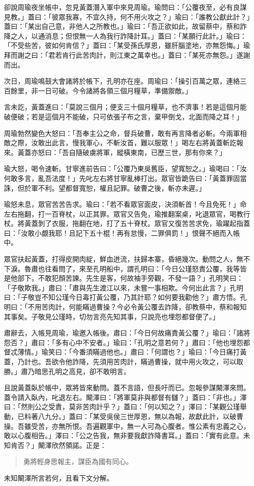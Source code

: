 卻說周瑜夜坐帳中，忽見黃蓋潛入軍中來見周瑜。瑜問曰：「公覆夜至，必有良謀見教。」蓋曰：「彼眾我寡，不宜久持，何不用火攻之？」瑜曰：「誰教公獻此計？」蓋曰：「某出自己意，非他人之所教也。」瑜曰：「吾正欲如此，故留蔡中，蔡和詐降之人，以通消息；但恨無一人為我行詐降計耳。」蓋曰：「某願行此計。」瑜曰：「不受些苦，彼如何肯信？」蓋曰：「某受孫氏厚恩，雖肝腦塗地，亦無怨悔。」瑜拜而謝之曰：「君若肯行此苦肉計，則江東之萬幸也。」蓋曰：「某死亦無怨。」遂謝而出。

次日，周瑜鳴鼓大會諸將於帳下，孔明亦在座。周瑜曰：「操引百萬之眾，連絡三百餘里，非一日可破。今令諸將各領三個月糧草，準備禦敵。」

言未訖，黃蓋進曰：「莫說三個月；便支三十個月糧草，也不濟事！若是這個月能破便破；若是這個月不能破，只可依張子布之言，棄甲倒戈，北面而降之耳！」

周瑜勃然變色大怒曰：「吾奉主公之命，督兵破曹，敢有再言降者必斬。今兩軍相敵之際，汝敢出此言，慢我軍心，不斬汝首，難以服眾！」喝左右將黃蓋斬訖報來。黃蓋亦怒曰：「吾自隨破虜將軍，縱橫東南，已歷三世，那有你來？」

瑜大怒，喝令速斬。甘寧進前告曰：「公覆乃東吳舊臣，望寬恕之。」瑜喝曰：「汝何敢多言，亂吾法度！」先叱左右將甘寧亂棒打出。眾官皆跪告曰：「黃蓋罪固當誅，但於軍不利。望都督寬恕，權且記罪。破曹之後，斬亦未遲。」

瑜怒未息，眾官苦苦告求。瑜曰：「若不看眾官面皮，決須斬首！今且免死！」命左右拖翻，打一百脊杖，以正其罪。眾官又告免，瑜推翻案桌，叱退眾官，喝教行杖。將黃蓋剝了衣服，拖翻在地，打了五十脊杖。眾官又復苦苦求免，瑜躍起指蓋曰：「汝敢小覷我耶！且記下五十棍！再有怠慢，二罪俱罰！」恨聲不絕而入帳中。

眾官扶起黃蓋，打得皮開肉綻，鮮血迸流，扶歸本寨，昏絕幾次。動問之人，無不下淚。魯肅也往看問了，來至孔明船中，謂孔明曰：「今日公瑾怒責公覆，我等皆是他部下，不敢犯顏苦諫。先生是客，何故袖手旁觀，不發一語？」孔明笑曰：「子敬欺我。」肅曰：「肅與先生渡江以來，未嘗一事相欺。今何出此言？」孔明曰：「子敬豈不知公瑾今日毒打黃公覆，乃其計耶？如何要我勸他？」肅方悟。孔明曰：「不用苦肉計，何能瞞過曹操？今必令黃公覆去詐降，卻教蔡中，蔡和報知其事矣。子敬見公瑾時，切勿言亮先知其事，只說亮也埋怨都督便了。」

肅辭去，入帳見周瑜，瑜邀入帳後。肅曰：「今日何故痛責黃公覆？」瑜曰：「諸將怨否？」肅曰：「多有心中不安者。」瑜曰：「孔明之意若何？」肅曰：「他也埋怨都督忒薄情。」瑜笑曰：「今番須瞞過他也。」肅曰：「何謂也？」瑜曰：「今日痛打黃蓋，乃計也。吾欲令他詐降，先須用苦肉計，瞞過曹操，就中用火攻之，可以取勝。」肅乃暗思孔明之高見，卻不敢明言。

且說黃蓋臥於帳中，眾將皆來動問。蓋不言語，但長吁而已。忽報參謀闞澤來問。蓋令請入臥內，叱退左右。闞澤曰：「將軍莫非與都督有讎？」蓋曰：「非也。」澤曰：「然則公之受責，莫非苦肉計乎？」蓋曰：「何以知之？」澤曰：「某觀公瑾舉動，已料著八九分。」蓋曰：「某受吳侯三世厚恩，無以為報，故獻此計，以破曹操。吾雖受苦，亦無所恨。吾遍觀軍中，無一人可為心腹者。惟公素有忠義之心，敢以心腹相告。」澤曰：「公之告我，無非要我獻詐降書耳。」蓋曰：「實有此意。未知肯否？」闞澤欣然領諾。正是：

\begin{quote}
勇將輕身思報主，謀臣為國有同心。
\end{quote}

未知闞澤所言若何，且看下文分解。
